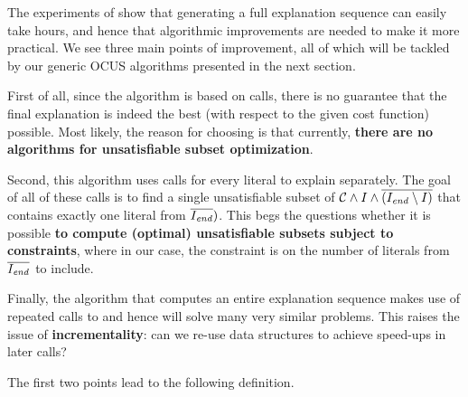 The experiments of \citet{ecai/BogaertsGCG20} show that generating a full explanation sequence can easily take hours, and hence that algorithmic improvements are needed to make it more practical. 
We see three main points of improvement, all of which will be tackled by our generic OCUS algorithms presented in the next section. 
\begin{inparaenum}
 \item First of all, since the algorithm is based on  calls, there is no guarantee that the final explanation is indeed the best (with respect to the given cost function) possible. 
 Most likely, the reason for choosing  is that currently, \textbf{there are no algorithms for unsatisfiable subset optimization}. 
 \item Second, this algorithm uses  calls for every literal to explain separately. The goal of all of these calls is to find a single unsatisfiable subset of $\mathcal{C}  \land I \land \overline{(I_\mathit{end} \setminus I)}$ that contains exactly one literal from $\overline{I_\mathit{end} })$. This begs the questions whether it is possible \textbf{to compute (optimal) unsatisfiable subsets subject to constraints}, where in our case, the constraint is on the number of literals from $\overline{I_\mathit{end} }$ to include. 
 \item Finally, the algorithm that computes an entire explanation sequence makes use of repeated calls to \onestep and hence will solve many very similar problems. This raises the issue of \textbf{incrementality}: can we re-use data structures to achieve speed-ups in later calls? 
\end{inparaenum}

The first two points lead to the following definition. 


